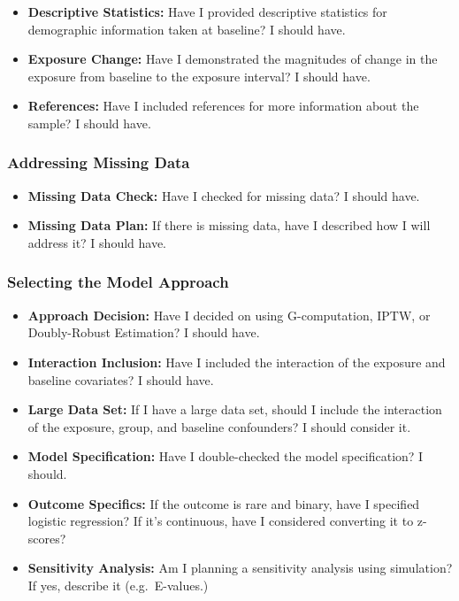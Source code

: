 \documentclass[
  singlecolumn]{article}
\providecommand{\tightlist}{%
  \setlength{\itemsep}{0pt}\setlength{\parskip}{0pt}}\usepackage{longtable,booktabs,array}
\begin{document}
\begin{itemize}
\tightlist
\item
  \textbf{Descriptive Statistics:} Have I provided descriptive
  statistics for demographic information taken at baseline? I should
  have.
\item
  \textbf{Exposure Change:} Have I demonstrated the magnitudes of change
  in the exposure from baseline to the exposure interval? I should have.
\item
  \textbf{References:} Have I included references for more information
  about the sample? I should have.
\end{itemize}

\hypertarget{addressing-missing-data}{%
\subsubsection{Addressing Missing Data}\label{addressing-missing-data}}

\begin{itemize}
\tightlist
\item
  \textbf{Missing Data Check:} Have I checked for missing data? I should
  have.
\item
  \textbf{Missing Data Plan:} If there is missing data, have I described
  how I will address it? I should have.
\end{itemize}

\hypertarget{selecting-the-model-approach}{%
\subsubsection{Selecting the Model
Approach}\label{selecting-the-model-approach}}

\begin{itemize}
\tightlist
\item
  \textbf{Approach Decision:} Have I decided on using G-computation,
  IPTW, or Doubly-Robust Estimation? I should have.
\item
  \textbf{Interaction Inclusion:} Have I included the interaction of the
  exposure and baseline covariates? I should have.
\item
  \textbf{Large Data Set:} If I have a large data set, should I include
  the interaction of the exposure, group, and baseline confounders? I
  should consider it.
\item
  \textbf{Model Specification:} Have I double-checked the model
  specification? I should.
\item
  \textbf{Outcome Specifics:} If the outcome is rare and binary, have I
  specified logistic regression? If it's continuous, have I considered
  converting it to z-scores?
\item
  \textbf{Sensitivity Analysis:} Am I planning a sensitivity analysis
  using simulation? If yes, describe it (e.g.~E-values.)
\end{itemize}
\end{document}
